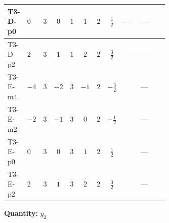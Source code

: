 \documentclass[8pt]{article}
\begin{document}
\begin{landscape}
\begin{longtable}{@{}llcccccc >{\raggedright\arraybackslash}p{0.21\linewidth} >{\raggedright\arraybackslash}p{0.21\linewidth} >{\raggedright\arraybackslash}p{0.21\linewidth}@{}}
\midrule
T3-D-p0 & $0$ & $3$ & $0$ & $1$ & $1$ & $2$ & $\frac{1}{2}$ & --- & --- & \scriptsize\adjustbox{max width=\linewidth}{$\begin{gathered} -\frac{9}{2} {g_2}^2 \left({y_2}\right)_{ij}\end{gathered}$} \\
\midrule
T3-D-p2 & $2$ & $3$ & $1$ & $1$ & $2$ & $2$ & $\frac{3}{2}$ & --- & --- & \scriptsize\adjustbox{max width=\linewidth}{$\begin{gathered} -\frac{9}{2} {g_2}^2 \left({y_2}\right)_{ij}\end{gathered}$} \\
\midrule
T3-E-m4 & $-4$ & $3$ & $-2$ & $3$ & $-1$ & $2$ & $-\frac{3}{2}$ & \scriptsize\adjustbox{max width=\linewidth}{$\begin{gathered} T_{\nu}^{(2)} \left({y_2}\right)_{ij}\end{gathered}$} & --- & \scriptsize\adjustbox{max width=\linewidth}{$\begin{gathered} -\frac{9}{2} {g_2}^2 \left({y_2}\right)_{ij}\end{gathered}$} \\
\midrule
T3-E-m2 & $-2$ & $3$ & $-1$ & $3$ & $0$ & $2$ & $-\frac{1}{2}$ & \scriptsize\adjustbox{max width=\linewidth}{$\begin{gathered} T_{\nu}^{(2)} \left({y_2}\right)_{ij}\end{gathered}$} & --- & \scriptsize\adjustbox{max width=\linewidth}{$\begin{gathered} -\frac{9}{2} {g_2}^2 \left({y_2}\right)_{ij}\end{gathered}$} \\
\midrule
T3-E-p0 & $0$ & $3$ & $0$ & $3$ & $1$ & $2$ & $\frac{1}{2}$ & \scriptsize\adjustbox{max width=\linewidth}{$\begin{gathered} T_{\nu}^{(2)} \left({y_2}\right)_{ij}\end{gathered}$} & --- & \scriptsize\adjustbox{max width=\linewidth}{$\begin{gathered} -\frac{9}{2} {g_2}^2 \left({y_2}\right)_{ij}\end{gathered}$} \\
\midrule
T3-E-p2 & $2$ & $3$ & $1$ & $3$ & $2$ & $2$ & $\frac{3}{2}$ & \scriptsize\adjustbox{max width=\linewidth}{$\begin{gathered} T_{\nu}^{(2)} \left({y_2}\right)_{ij}\end{gathered}$} & --- & \scriptsize\adjustbox{max width=\linewidth}{$\begin{gathered} -\frac{9}{2} {g_2}^2 \left({y_2}\right)_{ij}\end{gathered}$} \\
\midrule
\bottomrule
\end{longtable}
\clearpage
\noindent\textbf{Quantity: }$y_2$\par\smallskip

\end{landscape}
\end{document}
